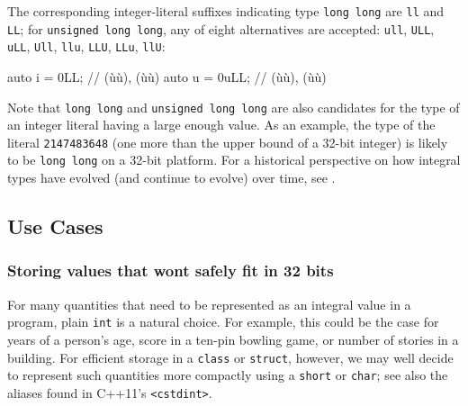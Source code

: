 The corresponding integer-literal suffixes indicating type
\lstinline!long!~\lstinline!long! are \lstinline!ll! and \lstinline!LL!; for
\lstinline!unsigned!~\lstinline!long!~\lstinline!long!, any of eight alternatives
are accepted: \lstinline!ull!, \lstinline!ULL!, \lstinline!uLL!, \lstinline!Ull!,
\lstinline!llu!, \lstinline!LLU!, \lstinline!LLu!,
\lstinline!llU!:

\begin{emcppslisting}
auto i = 0LL;   // (ù{}ù), (ù{}ù)
auto u = 0uLL;  // (ù{}ù), (ù{}ù)
\end{emcppslisting}

\noindent Note that \lstinline!long!~\lstinline!long!
and \lstinline!unsigned!~\lstinline!long!~\lstinline!long! are also candidates
for the type of an integer literal having a large enough value. As an
example, the type of the literal \lstinline!2147483648! (one more than
the upper bound of a 32-bit integer) is likely to be
  \lstinline!long!~\lstinline!long! on a 32-bit platform. For a historical perspective on how integral types have evolved (and
continue to evolve) over time, see .

\subsection[Use Cases]{Use Cases}\label{use-cases}

\subsubsection[Storing values that won't safely fit in 32 bits]{Storing values that won{\subsubapos}t safely fit in 32 bits}\label{when-your-pedestrian-four-byte-int-might-not-cut-it}\label{Storing-values-that-won't-safely-fit-in-32-bits}

For many quantities that need to be represented as an integral value in a program, plain \lstinline!int! is a natural choice. For example, this could be the case for years of a person's age, score in a ten-pin bowling game, or number of stories in a building. For efficient storage in a \lstinline!class!
or \lstinline!struct!, however, we may well decide to represent such
quantities more compactly using a \lstinline!short! or \lstinline!char!; see
  also the aliases found in C++11's \lstinline!<cstdint>!.

